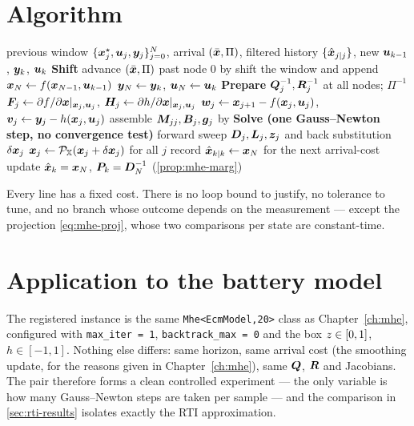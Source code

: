\section{Algorithm}
\begin{algorithm}[H]
\caption{MHE-RTI --- one sampling period (constant cost)}
\begin{algorithmic}[1]
\Require previous window $\{\bm{x}^\star_j,\bm{u}_j,\bm{y}_j\}_{j=0}^{N}$, arrival $(\bar{\bm{x}},\Pi)$, filtered
         history $\{\hat{\bm{x}}_{j|j}\}$, new $\bm{u}_{k-1}$, $\bm{y}_k$, $\bm{u}_k$
\Statex \textbf{Shift} 
\State advance $(\bar{\bm{x}},\Pi)$ past node $0$ by 
\State shift the window and append $\bm{x}_N \gets f(\bm{x}_{N-1},\bm{u}_{k-1})$ 
\State $\bm{y}_N\gets\bm{y}_k$, $\bm{u}_N\gets\bm{u}_k$
\Statex \textbf{Prepare} 
\State $\bm{Q}_j^{-1},\bm{R}_j^{-1}$ at all nodes; $\Pi^{-1}$
\State $\bm{F}_j \gets \partial f/\partial\bm{x}|_{\bm{x}_j,\bm{u}_j}$, $\bm{H}_j \gets \partial h/\partial\bm{x}|_{\bm{x}_j,\bm{u}_j}$
\State $\bm{w}_j \gets \bm{x}_{j+1}-f(\bm{x}_j,\bm{u}_j)$, $\bm{v}_j\gets\bm{y}_j-h(\bm{x}_j,\bm{u}_j)$
\State assemble $\bm{M}_{jj},\bm{B}_j,\bm{g}_j$ by 
\Statex \textbf{Solve (one Gauss--Newton step, no convergence test)}
\State forward sweep $\bm{D}_j,\bm{L}_j,\bm{z}_j$ and back substitution $\delta\bm{x}_j$ 
\State $\bm{x}_j \gets \mathcal{P}_{\mathbb{X}}(\bm{x}_j + \delta\bm{x}_j)$ for all $j$ 
\State record $\hat{\bm{x}}_{k|k}\gets\bm{x}_N$ for the next arrival-cost update
\Ensure $\hat{\bm{x}}_k = \bm{x}_N$, $\bm{P}_k = \bm{D}_N^{-1}$ (\cref{prop:mhe-marg})
\end{algorithmic}
\end{algorithm}

Every line has a fixed cost.  There is no loop bound to justify, no tolerance to tune, and no
branch whose outcome depends on the measurement --- except the projection \cref{eq:mhe-proj}, whose
two comparisons per state are constant-time.

\section{Application to the battery model}
The registered instance is the same \texttt{Mhe<EcmModel,20>} class as Chapter~\ref{ch:mhe},
configured with \texttt{max\_iter = 1}, \texttt{backtrack\_max = 0} and the box
$z\in[0,1]$, $h\in[-1,1]$.  Nothing else differs: same horizon, same arrival cost (the smoothing
update, for the reasons given in Chapter~\ref{ch:mhe}), same $\bm{Q}$, $\bm{R}$ and Jacobians.  The pair
therefore forms a clean controlled experiment --- the only variable is how many Gauss--Newton steps
are taken per sample --- and the comparison in \cref{sec:rti-results} isolates exactly the RTI
approximation.

